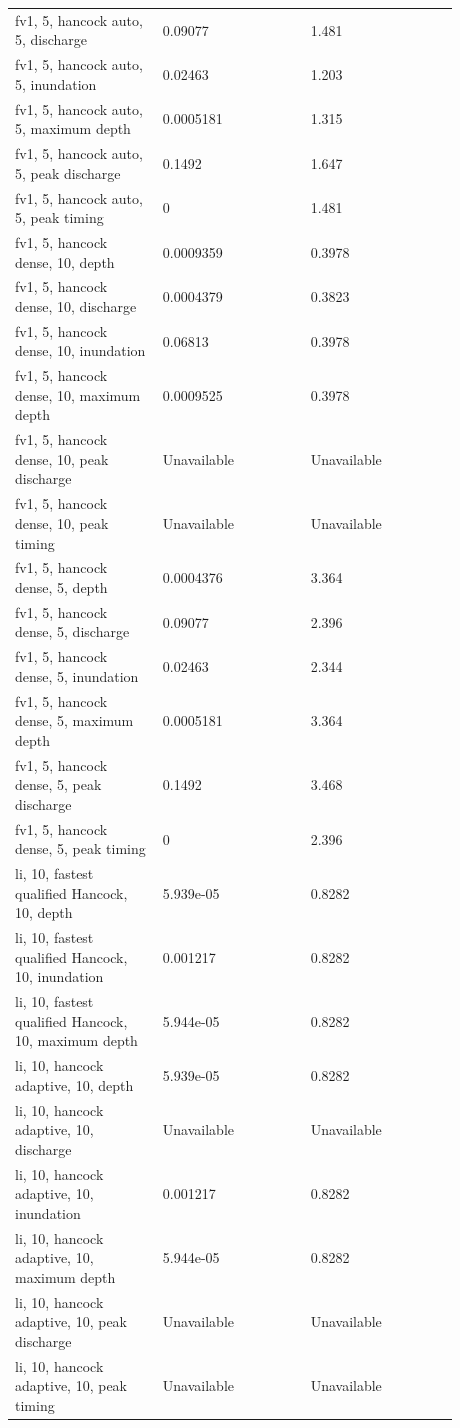 \begin{longtable}{p{0.2933\linewidth}p{0.2933\linewidth}p{0.2933\linewidth}}
fv1, 5, hancock auto, 5, discharge & 0.09077 & 1.481 \\
fv1, 5, hancock auto, 5, inundation & 0.02463 & 1.203 \\
fv1, 5, hancock auto, 5, maximum depth & 0.0005181 & 1.315 \\
fv1, 5, hancock auto, 5, peak discharge & 0.1492 & 1.647 \\
fv1, 5, hancock auto, 5, peak timing & 0 & 1.481 \\
fv1, 5, hancock dense, 10, depth & 0.0009359 & 0.3978 \\
fv1, 5, hancock dense, 10, discharge & 0.0004379 & 0.3823 \\
fv1, 5, hancock dense, 10, inundation & 0.06813 & 0.3978 \\
fv1, 5, hancock dense, 10, maximum depth & 0.0009525 & 0.3978 \\
fv1, 5, hancock dense, 10, peak discharge & Unavailable & Unavailable \\
fv1, 5, hancock dense, 10, peak timing & Unavailable & Unavailable \\
fv1, 5, hancock dense, 5, depth & 0.0004376 & 3.364 \\
fv1, 5, hancock dense, 5, discharge & 0.09077 & 2.396 \\
fv1, 5, hancock dense, 5, inundation & 0.02463 & 2.344 \\
fv1, 5, hancock dense, 5, maximum depth & 0.0005181 & 3.364 \\
fv1, 5, hancock dense, 5, peak discharge & 0.1492 & 3.468 \\
fv1, 5, hancock dense, 5, peak timing & 0 & 2.396 \\
li, 10, fastest qualified Hancock, 10, depth & 5.939e-05 & 0.8282 \\
li, 10, fastest qualified Hancock, 10, inundation & 0.001217 & 0.8282 \\
li, 10, fastest qualified Hancock, 10, maximum depth & 5.944e-05 & 0.8282 \\
li, 10, hancock adaptive, 10, depth & 5.939e-05 & 0.8282 \\
li, 10, hancock adaptive, 10, discharge & Unavailable & Unavailable \\
li, 10, hancock adaptive, 10, inundation & 0.001217 & 0.8282 \\
li, 10, hancock adaptive, 10, maximum depth & 5.944e-05 & 0.8282 \\
li, 10, hancock adaptive, 10, peak discharge & Unavailable & Unavailable \\
li, 10, hancock adaptive, 10, peak timing & Unavailable & Unavailable \\

\end{longtable}
